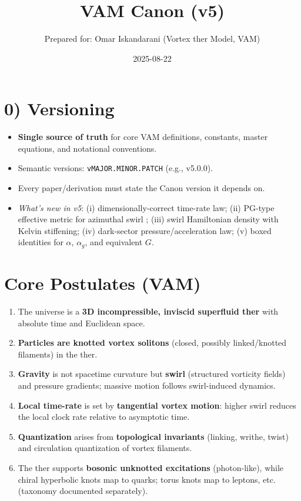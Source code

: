 \documentclass[11pt,a4paper]{article}
\title{\bfseries VAM Canon (v5)}
\author{Prepared for: Omar Iskandarani (Vortex \aeether{}ther Model, VAM)}
\date{2025-08-22}
\newcommand{\aeether}{\text{\ae}} %
\begin{document}
    \maketitle
    \tableofcontents

    \section*{0) Versioning}
    \begin{itemize}
        \item \textbf{Single source of truth} for core VAM definitions, constants, master equations, and notational conventions.
        \item Semantic versions: \texttt{vMAJOR.MINOR.PATCH} (e.g., v5.0.0).
        \item Every paper/derivation must state the Canon version it depends on.
        \item \emph{What’s new in v5}: (i) dimensionally-correct time-rate law; (ii) PG-type effective metric for azimuthal swirl \cite{Unruh1981,Visser1998,Painleve1921,Gullstrand1922}; (iii) swirl Hamiltonian density with Kelvin stiffening; (iv) dark-sector pressure/acceleration law; (v) boxed identities for $\alpha$, $\alpha_g$, and equivalent $G$.
    \end{itemize}

    \section{Core Postulates (VAM)}
    \begin{enumerate}
        \item The universe is a \textbf{3D incompressible, inviscid superfluid \aeether{}ther} with absolute time and Euclidean space.
        \item \textbf{Particles are knotted vortex solitons} (closed, possibly linked/knotted filaments) in the \aeether{}ther.
        \item \textbf{Gravity} is not spacetime curvature but \textbf{swirl} (structured vorticity fields) and pressure gradients; massive motion follows swirl-induced dynamics.
        \item \textbf{Local time-rate} is set by \textbf{tangential vortex motion}: higher swirl reduces the local clock rate relative to asymptotic time.
        \item \textbf{Quantization} arises from \textbf{topological invariants} (linking, writhe, twist) and circulation quantization of vortex filaments.
        \item The \aeether{}ther supports \textbf{bosonic unknotted excitations} (photon-like), while chiral hyperbolic knots map to quarks; torus knots map to leptons, etc. (taxonomy documented separately).
    \end{enumerate}
\end{document}
